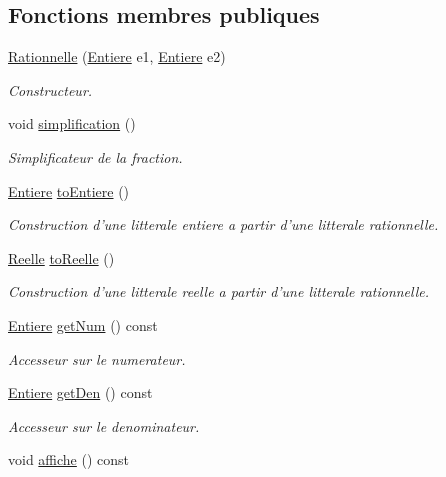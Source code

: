 \subsection*{Fonctions membres publiques}
\begin{CompactItemize}
\item 
\hyperlink{class_rationnelle_80e2778456d58509340e31e304d77b8f}{Rationnelle} (\hyperlink{class_entiere}{Entiere} e1, \hyperlink{class_entiere}{Entiere} e2)
\begin{CompactList}\small\item\em Constructeur. \item\end{CompactList}\item 
\hypertarget{class_rationnelle_a4f581d2864da2bc7437a00b911377d9}{
void \hyperlink{class_rationnelle_a4f581d2864da2bc7437a00b911377d9}{simplification} ()}
\label{class_rationnelle_a4f581d2864da2bc7437a00b911377d9}

\begin{CompactList}\small\item\em Simplificateur de la fraction. \item\end{CompactList}\item 
\hyperlink{class_entiere}{Entiere} \hyperlink{class_rationnelle_a912b36ff009510986a131cf0d9d5c7b}{toEntiere} ()
\begin{CompactList}\small\item\em Construction d'une litterale entiere a partir d'une litterale rationnelle. \item\end{CompactList}\item 
\hyperlink{class_reelle}{Reelle} \hyperlink{class_rationnelle_ae003cf8f8f8fd3f8ca25833019293c7}{toReelle} ()
\begin{CompactList}\small\item\em Construction d'une litterale reelle a partir d'une litterale rationnelle. \item\end{CompactList}\item 
\hyperlink{class_entiere}{Entiere} \hyperlink{class_rationnelle_7bb78e18fcebedf67e29da7b8da56483}{getNum} () const 
\begin{CompactList}\small\item\em Accesseur sur le numerateur. \item\end{CompactList}\item 
\hyperlink{class_entiere}{Entiere} \hyperlink{class_rationnelle_fa5d908b5e2e972af5a431efb6686b52}{getDen} () const 
\begin{CompactList}\small\item\em Accesseur sur le denominateur. \item\end{CompactList}\item 
\hypertarget{class_rationnelle_7d5f7cf77d2c916b97f3697a071300df}{
void \hyperlink{class_rationnelle_7d5f7cf77d2c916b97f3697a071300df}{affiche} () const }
\label{class_rationnelle_7d5f7cf77d2c916b97f3697a071300df}


\end{CompactItemize}
